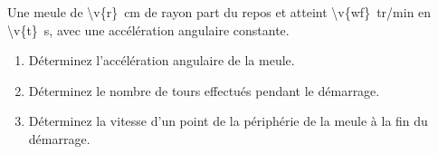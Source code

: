 Une meule de \qty{\v{r}}{cm} de rayon part du repos et atteint \qty{\v{wf}}{tr/min} en \qty{\v{t}}{s}, avec une accélération angulaire constante.

\begin{enumerate}[label=\alph*)]
    \item Déterminez l'accélération angulaire de la meule.
    \item Déterminez le nombre de tours effectués pendant le démarrage.
    \item Déterminez la vitesse d'un point de la périphérie de la meule à la fin du démarrage.
\end{enumerate}

